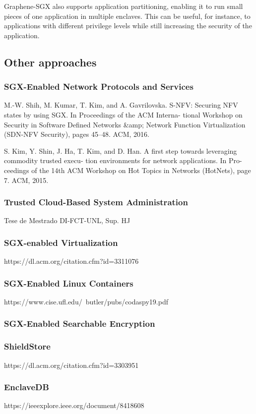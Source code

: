Graphene-SGX also supports application partitioning, enabling it to run small pieces of one application in multiple enclaves. This can be useful, for instance, to applications with different privilege levels while still increasing the security of the application.
\subsection{Other approaches}
\subsubsection{SGX-Enabled Network Protocols and Services}
M.-W. Shih, M. Kumar, T. Kim, and A. Gavrilovska. S-NFV: Securing NFV states by
using SGX. In Proceedings of the ACM Interna- tional Workshop on Security in
Software Defined Networks &amp; Network Function Virtualization (SDN-NFV Security),
pages 45–48. ACM, 2016.

S. Kim, Y. Shin, J. Ha, T. Kim, and D. Han. A first step towards leveraging commodity
trusted execu- tion environments for network applications. In Pro- ceedings of the
14th ACM Workshop on Hot Topics in Networks (HotNets), page 7. ACM, 2015.
\subsubsection{Trusted Cloud-Based System Administration}
Tese de Mestrado DI-FCT-UNL, Sup. HJ
\subsubsection{SGX-enabled Virtualization}
https://dl.acm.org/citation.cfm?id=3311076
\subsubsection{SGX-Enabled Linux Containers}
https://www.cise.ufl.edu/~butler/pubs/codaspy19.pdf
\subsubsection{SGX-Enabled Searchable Encryption}
\subsubsection{ShieldStore}
https://dl.acm.org/citation.cfm?id=3303951
\subsubsection{EnclaveDB}
https://ieeexplore.ieee.org/document/8418608



